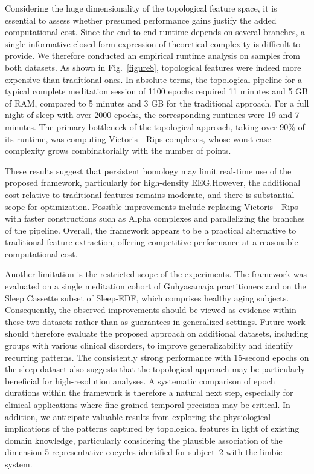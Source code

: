 \documentclass[pdflatex,sn-basic,Numbered]{sn-jnl}
\begin{document}
Considering the huge dimensionality of the topological feature space, it is essential to assess whether presumed performance gains justify the added computational cost. Since the end-to-end runtime depends on several branches, a single informative closed-form expression of theoretical complexity is difficult to provide. We therefore conducted an empirical runtime analysis on samples from both datasets. As shown in Fig.~\ref{figure8}, topological features were indeed more expensive than traditional ones. In absolute terms, the topological pipeline for a typical complete meditation session of 1100 epochs required 11 minutes and 5 GB of RAM, compared to 5 minutes and 3 GB for the traditional approach. For a full night of sleep with over 2000 epochs, the corresponding runtimes were 19 and 7 minutes. The primary bottleneck of the topological approach, taking over 90\% of its runtime, was computing Vietoris---Rips complexes, whose worst-case complexity grows combinatorially with the number of points.

These results suggest that persistent homology may limit real-time use of the proposed framework, particularly for high-density EEG.\@ However, the additional cost relative to traditional features remains moderate, and there is substantial scope for optimization. Possible improvements include replacing Vietoris---Rips with faster constructions such as Alpha complexes and parallelizing the branches of the pipeline. Overall, the framework appears to be a practical alternative to traditional feature extraction, offering competitive performance at a reasonable computational cost.

Another limitation is the restricted scope of the experiments. The framework was evaluated on a single meditation cohort of Guhyasamaja practitioners and on the Sleep Cassette subset of Sleep-EDF, which comprises healthy aging subjects. Consequently, the observed improvements should be viewed as evidence within these two datasets rather than as guarantees in generalized settings. Future work should therefore evaluate the proposed approach on additional datasets, including groups with various clinical disorders, to improve generalizability and identify recurring patterns. The consistently strong performance with 15-second epochs on the sleep dataset also suggests that the topological approach may be particularly beneficial for high-resolution analyses. A systematic comparison of epoch durations within the framework is therefore a natural next step, especially for clinical applications where fine-grained temporal precision may be critical. In addition, we anticipate valuable results from exploring the physiological implications of the patterns captured by topological features in light of existing domain knowledge, particularly considering the plausible association of the dimension-5 representative cocycles identified for subject~2 with the limbic system.
\end{document}

